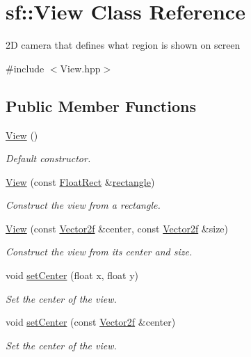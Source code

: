 \hypertarget{classsf_1_1_view}{\section{sf\+:\+:View Class Reference}
\label{classsf_1_1_view}
}


2\+D camera that defines what region is shown on screen  




{\ttfamily \#include $<$View.\+hpp$>$}

\subsection*{Public Member Functions}
\begin{DoxyCompactItemize}
\item 
\hyperlink{classsf_1_1_view_a28c38308ff089ae5bdacd001d12286d3}{View} ()
\begin{DoxyCompactList}\small\item\em Default constructor. \end{DoxyCompactList}\item 
\hyperlink{classsf_1_1_view_a1d63bc49e041b3b1ff992bb6430e1326}{View} (const \hyperlink{classsf_1_1_rect}{Float\+Rect} \&\hyperlink{structrectangle}{rectangle})
\begin{DoxyCompactList}\small\item\em Construct the view from a rectangle. \end{DoxyCompactList}\item 
\hyperlink{classsf_1_1_view_afdaf84cfc910ef160450d63603457ea4}{View} (const \hyperlink{classsf_1_1_vector2}{Vector2f} \&center, const \hyperlink{classsf_1_1_vector2}{Vector2f} \&size)
\begin{DoxyCompactList}\small\item\em Construct the view from its center and size. \end{DoxyCompactList}\item 
void \hyperlink{classsf_1_1_view_aa8e3fedb008306ff9811163545fb75f2}{set\+Center} (float x, float y)
\begin{DoxyCompactList}\small\item\em Set the center of the view. \end{DoxyCompactList}\item 
void \hyperlink{classsf_1_1_view_ab0296b03793e0873e6ae9e15311f3e78}{set\+Center} (const \hyperlink{classsf_1_1_vector2}{Vector2f} \&center)
\begin{DoxyCompactList}\small\item\em Set the center of the view. \end{DoxyCompactList}\item 

\end{DoxyCompactItemize}
